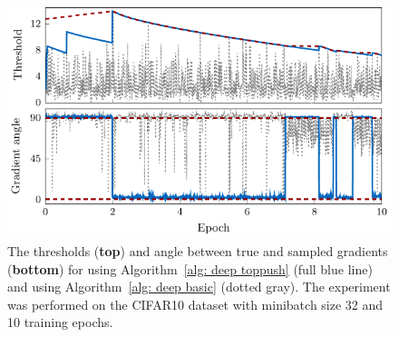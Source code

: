 \begin{figure}
  \centering
  \includegraphics{images/deep_thresholds.pdf}
  \caption{The thresholds (\textbf{top}) and angle between true and sampled gradients (\textbf{bottom}) for \DeepTopPush using Algorithm~\ref{alg: deep toppush} (full blue line) and \TopPush using Algorithm~\ref{alg: deep basic} (dotted gray). The experiment was performed on the CIFAR10 dataset with minibatch size 32 and 10 training epochs.}
  \label{fig:thresholds2}
\end{figure}